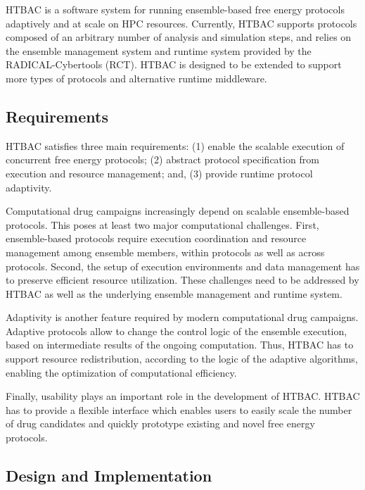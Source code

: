 HTBAC is a software system for running ensemble-based free energy protocols
adaptively and at scale on HPC resources. Currently, HTBAC supports protocols
composed of an arbitrary number of analysis and simulation steps, and relies
on the ensemble management system and runtime system provided by the
RADICAL-Cybertools (RCT). HTBAC is designed to be extended to support more
types of protocols and alternative runtime middleware.

\subsection{Requirements}

HTBAC satisfies three main requirements: (1) enable the scalable execution of
concurrent free energy protocols; (2) abstract protocol specification from
execution and resource management; and, (3) provide runtime protocol
adaptivity.

Computational drug campaigns increasingly depend on scalable ensemble-based
protocols. This poses at least two major computational challenges. First,
ensemble-based protocols require execution coordination and resource
management among ensemble members, within protocols as well as across
protocols. Second, the setup of execution environments and data management
has to preserve efficient resource utilization. These challenges need to be
addressed by HTBAC as well as the underlying ensemble management and runtime
system.

Adaptivity is another feature required by modern computational drug
campaigns. Adaptive protocols allow to change the control logic of the
ensemble execution, based on intermediate results of the ongoing computation.
Thus, HTBAC has to support resource redistribution, according to the logic of
the adaptive algorithms, enabling the optimization of computational
efficiency.

Finally, usability plays an important role in the development of HTBAC. HTBAC
has to provide a flexible interface which enables users to easily scale the
number of drug candidates and quickly prototype existing and novel free
energy protocols.

\subsection{Design and Implementation}\label{ssec:design_arch}

